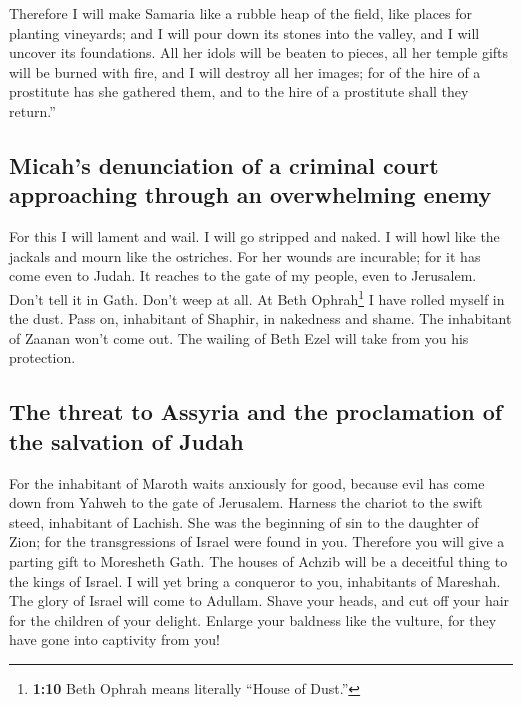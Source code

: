  Therefore I will make Samaria like a rubble heap of the
field, like places for planting vineyards; and I will pour down its
stones into the valley, and I will uncover its foundations.
 All her idols will be beaten to pieces, all her temple
gifts will be burned with fire, and I will destroy all her images; for
of the hire of a prostitute has she gathered them, and to the hire of a
prostitute shall they return.''

\hypertarget{micahs-denunciation-of-a-criminal-court-approaching-through-an-overwhelming-enemy}{%
\subsection{Micah's denunciation of a criminal court approaching through
an overwhelming
enemy}\label{micahs-denunciation-of-a-criminal-court-approaching-through-an-overwhelming-enemy}}

 For this I will lament and wail. I will go stripped and
naked. I will howl like the jackals and mourn like the ostriches.
 For her wounds are incurable; for it has come even to
Judah. It reaches to the gate of my people, even to Jerusalem.
 Don't tell it in Gath. Don't weep at all. At Beth
Ophrah\footnote{\textbf{1:10} Beth Ophrah means literally ``House of
  Dust.''} I have rolled myself in the dust.  Pass on,
inhabitant of Shaphir, in nakedness and shame. The inhabitant of Zaanan
won't come out. The wailing of Beth Ezel will take from you his
protection.

\hypertarget{the-threat-to-assyria-and-the-proclamation-of-the-salvation-of-judah}{%
\subsection{The threat to Assyria and the proclamation of the salvation
of
Judah}\label{the-threat-to-assyria-and-the-proclamation-of-the-salvation-of-judah}}

 For the inhabitant of Maroth waits anxiously for good,
because evil has come down from Yahweh to the gate of Jerusalem.
 Harness the chariot to the swift steed, inhabitant of
Lachish. She was the beginning of sin to the daughter of Zion; for the
transgressions of Israel were found in you.  Therefore
you will give a parting gift to Moresheth Gath. The houses of Achzib
will be a deceitful thing to the kings of Israel.  I will
yet bring a conqueror to you, inhabitants of Mareshah. The glory of
Israel will come to Adullam.  Shave your heads, and cut
off your hair for the children of your delight. Enlarge your baldness
like the vulture, for they have gone into captivity from you!

